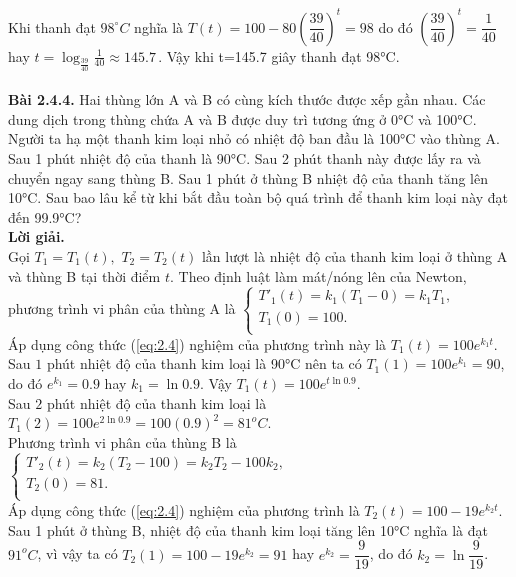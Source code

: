 Khi thanh đạt $98^{\circ}C$ nghĩa là $T(t)=100-80{{(\dfrac{39}{40})}^{t}}=98$ do đó ${{(\dfrac{39}{40})}^{t}}=\dfrac{1}{40}$\newline hay $t={{\log }_{\frac{39}{40}}}\frac{1}{40}\approx 145.7\,$. Vậy khi t=145.7 giây thanh đạt 98°C.\\ \\
\textbf{Bài 2.4.4.} Hai thùng lớn A và B có cùng kích thước được xếp gần nhau. Các dung dịch trong thùng chứa A và B được duy trì tương ứng ở 0°C và 100°C. Người ta hạ một thanh kim loại nhỏ có nhiệt độ ban đầu là 100°C  vào thùng A. Sau 1 phút nhiệt độ của thanh là 90°C. Sau 2 phút thanh này được lấy ra và chuyển ngay sang thùng B. Sau 1 phút ở thùng B nhiệt độ của thanh tăng lên 10°C. Sau bao lâu kể từ khi bắt đầu toàn bộ quá trình để thanh kim loại này đạt đến 99.9°C?\\
\textbf{Lời giải.}\\
Gọi ${{T}_{1}}={{T}_{1}}(t),\,\,{{T}_{2}}={{T}_{2}}(t)$ lần lượt là nhiệt độ của thanh kim loại ở thùng A và thùng B tại thời điểm $t$. Theo định luật làm mát/nóng lên của Newton, phương trình vi phân của thùng A là $\left\{ \begin{array}{l}
	 {{{{T}'}}_{1}}(t)={{k}_{1}}\left( {{T}_{1}}-0 \right)={{k}_{1}}{{T}_{1}}, \\ 
	 {{T}_{1}}(0)=100. \\ 
\end{array} \right.$\\
Áp dụng công thức (\ref{eq:2.4}) nghiệm của phương trình này là ${{T}_{1}}(t)=100{{e}^{{{k}_{1}}t}}$.  \\
Sau $1$ phút nhiệt độ của thanh kim loại là 90°C nên ta có ${{T}_{1}}(1)=100{{e}^{{{k}_{1}}}}=90$, do đó ${{e}^{{{k}_{1}}}}=0.9 $ hay $ {{k}_{1}}=\ln 0.9$. Vậy ${{T}_{1}}(t)=100{{e}^{t\ln 0.9}}.$ \\
Sau $2$ phút nhiệt độ của thanh kim loại là  ${{T}_{1}}(2)=100{{e}^{2\ln 0.9}}=100{{(0.9)}^{2}}={{81}^{o}}C.$ \\
Phương trình vi phân của thùng B là  $\left\{ \begin{array}{l} {{{{T}'}}_{2}}(t)={{k}_{2}}\left( {{T}_{2}}-100 \right)={{k}_{2}}{{T}_{2}}-100{{k}_{2}}, \\ 
	 {{T}_{2}}(0)=81. \\ 
\end{array} \right.$\\
Áp dụng công thức (\ref{eq:2.4}) nghiệm của phương trình là ${{T}_{2}}(t)=100-19{{e}^{{{k}_{2}}t}}.$\\
Sau 1 phút ở thùng B, nhiệt độ của thanh kim loại tăng lên 10°C nghĩa là đạt  ${{91}^{o}}C$, vì vậy ta có  ${{T}_{2}}(1)=100-19{{e}^{{{k}_{2}}}}=91 $ hay $ {{e}^{{{k}_{2}}}}=\dfrac{9}{19}$, do đó  ${{k}_{2}}=\ln \dfrac{9}{19}$.\\
